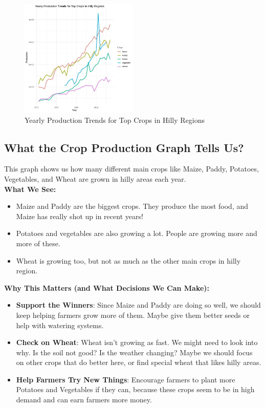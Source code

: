 \begin{figure}[h]
\centering
\includegraphics[width=0.5\textwidth]{figures/top5_agri.jpg}
\caption{Yearly Production Trends for Top Crops in Hilly Regions}
\end{figure}

\subsection*{What the Crop Production Graph Tells Us?}
This graph shows us how many different main crops like Maize, Paddy, Potatoes, Vegetables, and Wheat are grown in hilly areas each year.\\

\textbf{What We See:}
\begin{itemize}
    \item Maize and Paddy are the biggest crops. They produce the most food, and Maize has really shot up in recent years!
    \item Potatoes and vegetables are also growing a lot. People are growing more and more of these.
    \item Wheat is growing too, but not as much as the other main crops in hilly region.
\end{itemize}

\textbf{Why This Matters (and What Decisions We Can Make):}
\begin{itemize}
    \item \textbf{Support the Winners}: Since Maize and Paddy are doing so well, we should keep helping farmers grow more of them. Maybe give them better seeds or help with watering systems.
    \item \textbf{Check on Wheat}: Wheat isn't growing as fast. We might need to look into why. Is the soil not good? Is the weather changing? Maybe we should focus on other crops that do better here, or find special wheat that likes hilly areas.
    \item \textbf{Help Farmers Try New Things}: Encourage farmers to plant more Potatoes and Vegetables if they can, because these crops seem to be in high demand and can earn farmers more money.
\end{itemize}

